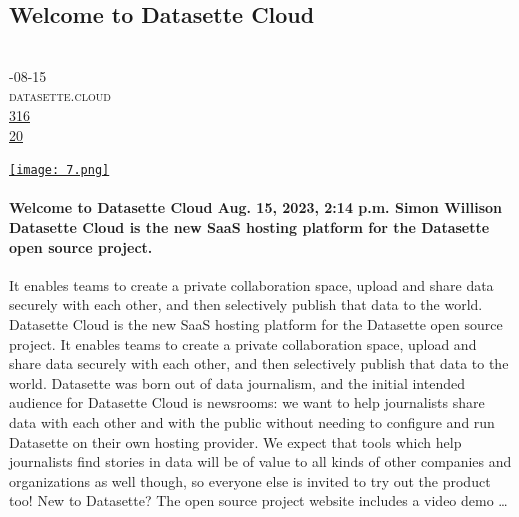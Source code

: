 \documentclass[10pt,a4paper]{article}
\begin{document}
\subsection{Welcome to Datasette Cloud}
\noindent\begin{minipage}[t]{0.19\linewidth}
\vspace{0pt}
\noindent\scshape\footnotesize
\\ {\scriptsize\faCalendar}-08-15
\\ {\scriptsize\faGlobe}\space 
datasette.cloud
\\ {\scriptsize\faThumbsOUp}\space 
\href{http://news.ycombinator.com/item?id=37196461\&utm\_term=comment}{316} 
\\ {\scriptsize\faComments}\space 
\href{http://news.ycombinator.com/item?id=37196461\&utm\_term=comment}{20} 
\end{minipage} 
\begin{minipage}[t]{0.80\linewidth}
\vspace{0pt}
\begin{multicols}{2}
    \href{https://www.datasette.cloud/blog/2023/welcome/?utm\_source=hackernewsletter\&utm\_medium=email\&utm\_term=fav}{
        \texttt{[image: 7.png]}
    }
\paragraph{Welcome to Datasette Cloud
Aug. 15, 2023, 2:14 p.m. Simon Willison
Datasette Cloud is the new SaaS hosting platform for the Datasette open source project.}
 It enables teams to create a private collaboration space, upload and share data securely with each other, and then selectively publish that data to the world.
Datasette Cloud is the new SaaS hosting platform for the Datasette open source project. It enables teams to create a private collaboration space, upload and share data securely with each other, and then selectively publish that data to the world.
Datasette was born out of data journalism, and the initial intended audience for Datasette Cloud is newsrooms: we want to help journalists share data with each other and with the public without needing to configure and run Datasette on their own hosting provider.
We expect that tools which help journalists find stories in data will be of value to all kinds of other companies and organizations as well though, so everyone else is invited to try out the product too!
New to Datasette? The open source project website includes a video demo
\dots
\end{multicols}
\end{minipage}
\par\medskip
\end{document}
